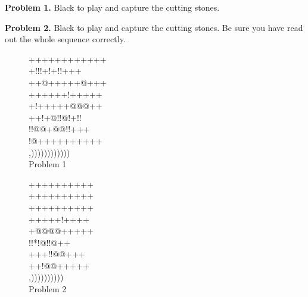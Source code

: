 \documentclass[mcrownvopaper,10pt,twopage,onecolumn,final]{memoir}
\begin{document}
\noindent
\textbf{Problem 1.} Black to play and capture the cutting stones.

\noindent
\textbf{Problem 2.} Black to play and capture the cutting stones. Be sure you
have read out the whole sequence correctly.

\begin{figure}[ht]
    \begin{minipage}[c]{0.57\linewidth}
        \centering    
        {\gnos%
        ++++++++++++\\
        +!!!+!+!!+++\\
        ++@+++++@+++\\
        ++++++!+++++\\
        +!+++++@@@++\\
        ++!+@!!@!+!!\\
        !!@@+@@!!+++\\
        !@++++++++++\\
        ,))))))))))))\\
        }
        Problem 1
    \end{minipage}%
    \begin{minipage}[c]{0.43\linewidth}
        \centering    
        {\gnos%
        ++++++++++\\
        ++++++++++\\
        ++++++++++\\
        +++++!++++\\
        +@@@@+++++\\
        !!*!@!!@++\\
        +++!!@@+++\\
        ++!@@+++++\\
        ,))))))))))\\
        }
        Problem 2
    \end{minipage}
\end{figure}
\newpage
\end{document}
